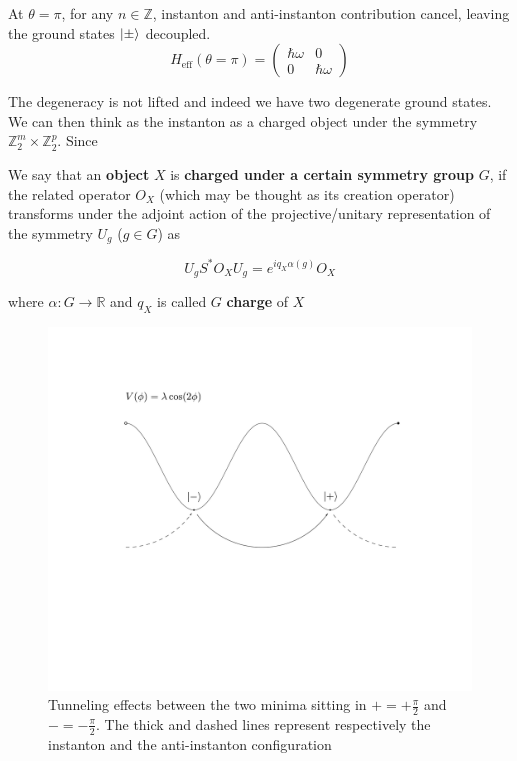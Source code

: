 \documentclass[11pt]{article}
\theoremstyle{definition}
\numberwithin{equation}{section}
\begin{document}
At $\theta= \pi$, for any $n \in \mathbb{Z}$, instanton and anti-instanton contribution cancel, leaving the ground states $\ket{\pm}$ decoupled. 
\begin{equation}
    H_{\text{eff}}(\theta=\pi)
= \begin{pmatrix}
 \hbar \omega &0 \\
 0  &\hbar \omega
    \end{pmatrix}
    \end{equation}

The degeneracy is not lifted and indeed we have two degenerate ground states. We can then think as the instanton as a charged object under the symmetry $\mathbb{Z}_2^m \times \mathbb{Z}_2^p$. Since 

\begin{Jargon}{}{}
We say that an \textbf{object} $X$ is \textbf{charged under a certain symmetry group} $G$, if the related operator $O_X$ (which may be thought as its creation operator) transforms under the adjoint action of the projective/unitary representation of the symmetry $U_g$ ($g \in G$) as

\begin{equation}
    U_g S^{*} O_X U_g = e^{i q_X \alpha(g)} O_X 
\end{equation}

where $\alpha: G \to \mathbb{R}$ and $q_X$ is called $G$ \textbf{charge} of $X$
\end{Jargon}

\begin{figure}[H]
	\centering
   	\includegraphics[trim={0cm 10cm 0cm 4cm}, clip, width=\textwidth]{instanton.pdf}
  	\caption{Tunneling effects between the two minima sitting in $+ = + \frac{\pi}{2}$ and $- = - \frac{\pi}{2}$. The thick and dashed lines represent respectively the instanton and the anti-instanton configuration}
   	\label{inst}
\end{figure}
\end{document}
